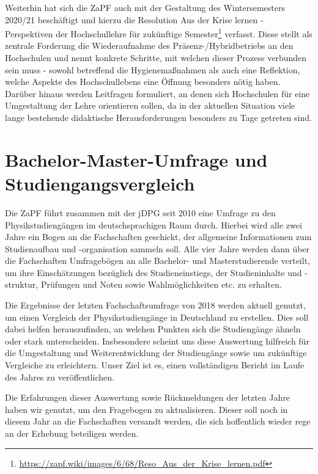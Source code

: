 \documentclass{scrartcl}
\begin{document}
Weiterhin hat sich die ZaPF auch mit der Gestaltung des Wintersemesters 2020/21 beschäftigt und hierzu die Resolution \glqq Aus der Krise lernen - Perspektiven der Hochschullehre für zukünftige Semester\grqq\footnote{\href{https://zapf.wiki/images/6/68/Reso_Aus_der_Krise_lernen.pdf}{https://zapf.wiki/images/6/68/Reso\_Aus\_der\_Krise\_lernen.pdf}} verfasst. Diese stellt als zentrale Forderung die Wiederaufnahme des Präsenz-/Hybridbetriebs an den Hochschulen und nennt konkrete Schritte, mit welchen dieser Prozess verbunden sein muss - sowohl betreffend die Hygienemaßnahmen als auch eine Reflektion, welche Aspekte des Hochschullebens eine Öffnung besonders nötig haben. Darüber hinaus werden Leitfragen formuliert, an denen sich Hochschulen für eine Umgestaltung der Lehre orientieren sollen, da in der aktuellen Situation viele lange bestehende didaktische Herausforderungen besonders zu Tage getreten sind.

\section*{Bachelor-Master-Umfrage und Studiengangsvergleich}
Die ZaPF führt zusammen mit der jDPG seit 2010 eine Umfrage zu den Physikstudiengängen im deutschsprachigen Raum durch. Hierbei wird alle zwei Jahre ein Bogen an die Fachschaften geschickt, der allgemeine Informationen zum Studienaufbau und -organisation sammeln soll.  Alle vier Jahre werden dann über die Fachschaften Umfragebögen an alle Bachelor- und Masterstudierende verteilt, um ihre Einschätzungen bezüglich des Studieneinstiegs, der Studieninhalte und -struktur, Prüfungen und Noten sowie Wahlmöglichkeiten etc. zu erhalten. 

Die Ergebnisse der letzten Fachschaftsumfrage von 2018 werden aktuell genutzt, um einen Vergleich der Physikstudiengänge in Deutschland zu erstellen. Dies soll dabei helfen herauszufinden, an welchen Punkten sich die Studiengänge ähneln oder stark unterscheiden. Insbesondere scheint uns diese Auswertung hilfreich für die Umgestaltung und Weiterentwicklung der Studiengänge sowie um zukünftige Vergleiche zu erleichtern. Unser Ziel ist es, einen vollständigen Bericht im Laufe des Jahres zu veröffentlichen.

Die Erfahrungen dieser Auswertung sowie Rückmeldungen der letzten Jahre haben wir genutzt, um den Fragebogen zu aktualisieren. Dieser soll noch in diesem Jahr an die Fachschaften versandt werden, die sich hoffentlich wieder rege an der Erhebung beteiligen werden. 
\end{document}
